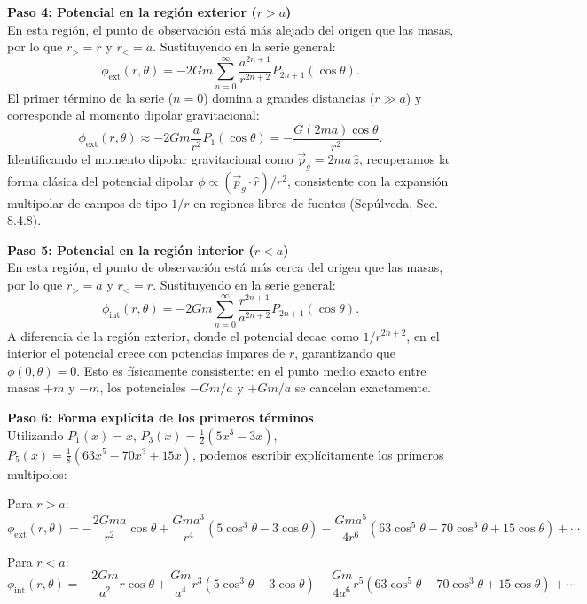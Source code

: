 \documentclass[a4paper]{article}
\begin{document}
\vspace{0.3cm}
\noindent\textbf{Paso 4: Potencial en la región exterior ($r > a$)}\\
En esta región, el punto de observación está más alejado del origen que las masas, por lo que $r_> = r$ y $r_< = a$. Sustituyendo en la serie general:
$$
\phi_{\text{ext}}(r, \theta) = -2Gm \sum_{n=0}^{\infty} \frac{a^{2n+1}}{r^{2n+2}} P_{2n+1}(\cos\theta).
$$
El primer término de la serie ($n=0$) domina a grandes distancias ($r \gg a$) y corresponde al momento dipolar gravitacional:
$$
\phi_{\text{ext}}(r, \theta) \approx -2Gm \frac{a}{r^2} P_1(\cos\theta) = -\frac{G(2ma)\cos\theta}{r^2}.
$$
Identificando el momento dipolar gravitacional como $\vec{p}_g = 2ma\,\hat{z}$, recuperamos la forma clásica del potencial dipolar $\phi \propto (\vec{p}_g \cdot \hat{r})/r^2$, consistente con la expansión multipolar de campos de tipo $1/r$ en regiones libres de fuentes (Sepúlveda, Sec. 8.4.8).

\vspace{0.3cm}
\noindent\textbf{Paso 5: Potencial en la región interior ($r < a$)}\\
En esta región, el punto de observación está más cerca del origen que las masas, por lo que $r_> = a$ y $r_< = r$. Sustituyendo en la serie general:
$$
\phi_{\text{int}}(r, \theta) = -2Gm \sum_{n=0}^{\infty} \frac{r^{2n+1}}{a^{2n+2}} P_{2n+1}(\cos\theta).
$$
A diferencia de la región exterior, donde el potencial decae como $1/r^{2n+2}$, en el interior el potencial crece con potencias impares de $r$, garantizando que $\phi(0, \theta) = 0$. Esto es físicamente consistente: en el punto medio exacto entre masas $+m$ y $-m$, los potenciales $-Gm/a$ y $+Gm/a$ se cancelan exactamente.

\vspace{0.3cm}
\noindent\textbf{Paso 6: Forma explícita de los primeros términos}\\
Utilizando $P_1(x)=x$, $P_3(x)=\frac{1}{2}(5x^3-3x)$, $P_5(x)=\frac{1}{8}(63x^5-70x^3+15x)$, podemos escribir explícitamente los primeros multipolos:

Para $r > a$:
$$
\phi_{\text{ext}}(r, \theta) = -\frac{2Gma}{r^2}\cos\theta + \frac{Gma^3}{r^4}(5\cos^3\theta - 3\cos\theta) - \frac{Gma^5}{4r^6}(63\cos^5\theta - 70\cos^3\theta + 15\cos\theta) + \cdots
$$

Para $r < a$:
$$
\phi_{\text{int}}(r, \theta) = -\frac{2Gm}{a^2}r\cos\theta + \frac{Gm}{a^4}r^3(5\cos^3\theta - 3\cos\theta) - \frac{Gm}{4a^6}r^5(63\cos^5\theta - 70\cos^3\theta + 15\cos\theta) + \cdots
$$
\end{document}
